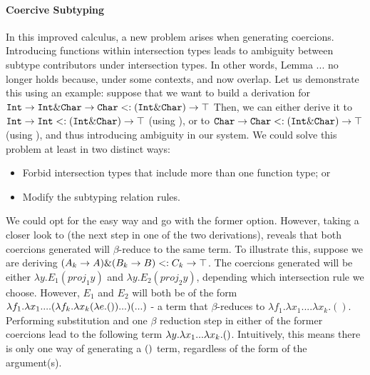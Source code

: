 
\paragraph{Coercive Subtyping}

In this improved calculus, a new problem arises when generating coercions. 
Introducing functions within intersection types leads to ambiguity between subtype contributors 
under intersection types.
In other words, Lemma ... no longer holds because, under some contexts, 
 and  now overlap. 
Let us demonstrate this using an example:
suppose that we want to build a derivation for  
$\texttt{Int} \to \texttt{Int} \& \texttt{Char} \to \texttt{Char} <: (\texttt{Int} \& \texttt{Char}) \to \top$
Then, we can either derive it to $\texttt{Int} \to \texttt{Int} <: (\texttt{Int} \& \texttt{Char}) \to \top$ 
(using ), or to $\texttt{Char} \to \texttt{Char} <: (\texttt{Int} \& \texttt{Char}) \to \top$
(using ), and thus introducing ambiguity in our system.
We could solve this problem at least in two distinct ways:

\begin{itemize}
\item Forbid intersection types that include more than one function type; or
\item Modify the subtyping relation rules. 
\end{itemize}

We could opt for the easy way and go with the former option. 
However, taking a closer look to  (the next step in one of the two derivations), reveals that both coercions generated will $\beta$-reduce to the same term. 
To illustrate this, suppose we are deriving $(A_k \to A) \& (B_k \to B) <: C_k \to \top$.
The coercions generated will be either $\lambda y. E_1 (proj_1 y)$ and $\lambda y. E_2 (proj_2 y)$, depending which intersection rule we choose.
However, $E_1$ and $E_2$ will both be of the form $\lambda f_1. \lambda x_1. ... (\lambda f_k. \lambda x_k (\lambda e. ())...) (...)$ - a term that $\beta$-reduces to $\lambda f_1. \lambda x_1. ... \lambda x_k. ()$.
Performing substitution and one $\beta$ reduction step in either of the former 
coercions lead to the following term  
$\lambda y. \lambda x_1... \lambda x_k. ()$.
Intuitively, this means there is only one way of generating a $()$ term, regardless of the form of the argument(s).

